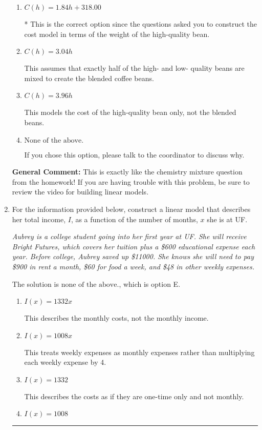 \documentclass{extbook}[14pt]
\newcommand{\litem}[1]{\item #1

\rule{\textwidth}{0.4pt}}
\begin{document}
\begin{enumerate}
{\begin{enumerate}[label=\Alph*.]
This would be correct if the question asked you to construct the cost model in terms of the weight of the low-quality bean.
\item \( C(h) = 1.84 h + 318.00 \)

* This is the correct option since the questions asked you to construct the cost model in terms of the weight of the high-quality bean.
\item \( C(h) = 3.04 h \)

This assumes that exactly half of the high- and low- quality beans are mixed to create the blended coffee beans.
\item \( C(h) = 3.96 h \)

This models the cost of the high-quality bean only, not the blended beans.
\item \( \text{None of the above.} \)

If you chose this option, please talk to the coordinator to discuss why.
\end{enumerate}

\textbf{General Comment:} This is exactly like the chemistry mixture question from the homework! If you are having trouble with this problem, be sure to review the video for building linear models.
}
\litem{
For the information provided below, construct a linear model that describes her total income, $I$, as a function of the number of months, $x$ she is at UF.

\begin{center}
    \textit{ Aubrey is a college student going into her first year at UF. She will receive Bright Futures, which covers her tuition plus a \$600 educational expense each year. Before college, Aubrey saved up \$11000. She knows she will need to pay \$900 in rent a month, \$60 for food a week, and \$48 in other weekly expenses. }
\end{center}


The solution is \( \text{none of the above.} \), which is option E.\begin{enumerate}[label=\Alph*.]
\item \( I(x) = 1332 x \)

This describes the monthly costs, not the monthly income.
\item \( I(x) = 1008 x \)

This treats weekly expenses as monthly expenses rather than multiplying each weekly expense by 4.
\item \( I(x) = 1332 \)

This describes the costs as if they are one-time only and not monthly.
\item \( I(x) = 1008 \)


\end{enumerate}}
\end{enumerate}
\end{document}
